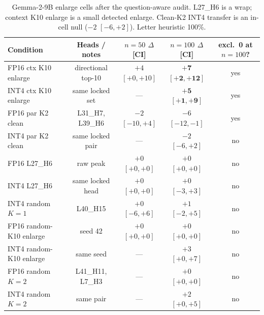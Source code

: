 \documentclass{article} %
\begin{document}
\begin{table}[ht]
\caption{Gemma-2-9B enlarge cells after the question-aware audit. L27\_H6 is a wrap; context K10 enlarge is a small detected enlarge. Clean-K2 INT4 transfer is an in-cell null ($-2$ $[-6,+2]$). Letter heuristic 100\%.}
\label{tab:gemma-fp16}
\centering
\footnotesize
\setlength{\tabcolsep}{3pt}
\begin{tabular}{lcccc}
\toprule
Condition & Heads / notes & $n{=}50$ $\Delta$ [CI] & $n{=}100$ $\Delta$ [CI] & excl.\ 0 at $n{=}100$? \\
\midrule
FP16 ctx K10 enlarge & directional top-10 & $+4$ $[+0,+10]$ & $\mathbf{+7}$ $\mathbf{[+2,+12]}$ & yes \\
INT4 ctx K10 enlarge & same locked set & --- & $\mathbf{+5}$ $\mathbf{[+1,+9]}$ & yes \\
FP16 par K2 clean & L31\_H7, L39\_H6 & $-2$ $[-10,+4]$ & $-6$ $[-12,-1]$ & yes \\
INT4 par K2 clean & same locked pair & --- & $-2$ $[-6,+2]$ & no \\
FP16 L27\_H6 & raw peak & $+0$ $[+0,+0]$ & $+0$ $[+0,+0]$ & no \\
INT4 L27\_H6 & same locked head & $+0$ $[+0,+0]$ & $+0$ $[-3,+3]$ & no \\
INT4 random $K{=}1$ & L40\_H15 & $+0$ $[-6,+6]$ & $+1$ $[-2,+5]$ & no \\
FP16 random-K10 enlarge & seed 42 & $+0$ $[+0,+0]$ & $+0$ $[+0,+0]$ & no \\
INT4 random-K10 enlarge & same seed & --- & $+3$ $[+0,+7]$ & no \\
FP16 random $K{=}2$ & L41\_H11, L7\_H3 & --- & $+0$ $[+0,+0]$ & no \\
INT4 random $K{=}2$ & same pair & --- & $+2$ $[+0,+5]$ & no \\
\bottomrule
\end{tabular}
\end{table}
\end{document}
